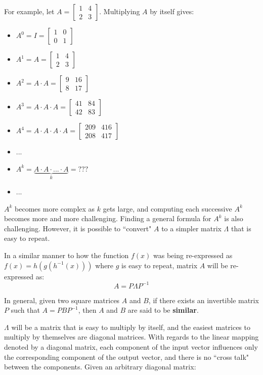 \documentclass{article}
\begin{document}
For example, let \(A = \begin{bmatrix} 1 & 4 \\ 2 & 3 \end{bmatrix}\). Multiplying \(A\) by itself gives:

\begin{itemize}
\item \(A^0 = I = \begin{bmatrix} 1 & 0 \\ 0 & 1 \end{bmatrix}\)
\item \(A^1 = A = \begin{bmatrix} 1 & 4 \\ 2 & 3 \end{bmatrix}\)
\item \(A^2 = A \cdot A = \begin{bmatrix} 9 & 16 \\ 8 & 17 \end{bmatrix}\) 
\item \(A^3 = A \cdot A \cdot A = \begin{bmatrix} 41 & 84 \\ 42 & 83 \end{bmatrix}\) 
\item \(A^4 = A \cdot A \cdot A \cdot A = \begin{bmatrix} 209 & 416 \\ 208 & 417 \end{bmatrix}\) 
\item ...
\item \(A^k = \underbrace{A \cdot A \cdot ... \cdot A}_k = ???\)
\item ...
\end{itemize}

\(A^k\) becomes more complex as \(k\) gets large, and computing each successive \(A^k\) becomes more and more challenging. Finding a general formula for \(A^k\) is also challenging. However, it is possible to ``convert" \(A\) to a simpler matrix \(\Lambda\) that is easy to repeat. 

In a similar manner to how the function \(f(x)\) was being re-expressed as \(f(x) = h(g(h^{-1}(x)))\) where \(g\) is easy to repeat, matrix \(A\) will be re-expressed as:
\[A = P \Lambda P^{-1}\]

In general, given two square matrices \(A\) and \(B\), if there exists an invertible matrix \(P\) such that \(A = PBP^{-1}\), then \(A\) and \(B\) are said to be {\bf similar}.

\(\Lambda\) will be a matrix that is easy to multiply by itself, and the easiest matrices to multiply by themselves are diagonal matrices. With regards to the linear mapping denoted by a diagonal matrix, each component of the input vector influences only the corresponding component of the output vector, and there is no ``cross talk" between the components. Given an arbitrary diagonal matrix:
\end{document}
